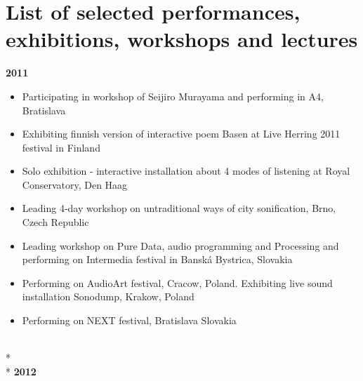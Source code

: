 
\chapter{List of selected performances, exhibitions, workshops and lectures}
\singlespacing
\textbf{2011}
\begin{itemize}
\item Participating in workshop of Seijiro Murayama and performing in A4, Bratislava
\item Exhibiting finnish version of interactive poem Basen at Live Herring 2011 festival in Finland
\item Solo exhibition - interactive installation about 4 modes of listening at Royal Conservatory, Den Haag
\item Leading 4-day workshop on untraditional ways of city sonification, Brno, Czech Republic
\item Leading workshop on Pure Data, audio programming and Processing and performing on Intermedia festival in Banská Bystrica, Slovakia
\item Performing on AudioArt festival, Cracow, Poland. Exhibiting live sound installation Sonodump, Krakow, Poland
\item Performing on NEXT festival, Bratislava Slovakia
\end{itemize}
\\*
\\*
\textbf{2012}
